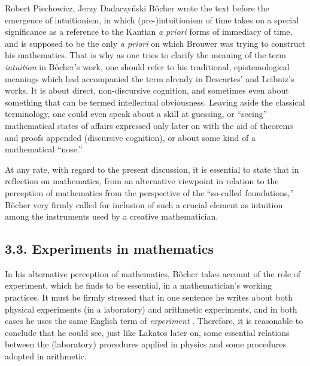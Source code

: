 \begin{artengenv}{Robert Piechowicz, Jerzy Dadaczyński}
Bôcher wrote the text before the emergence of intuitionism, in which (pre-)intuitionism of time takes on a special significance as a reference to the Kantian \textit{a priori} forms of immediacy of time, and is supposed to be the only \textit{a priori} on which Brouwer was trying to construct his mathematics. That is why as one tries to clarify the meaning of the term \textit{intuition} in Bôcher's work, one should refer to his traditional, epistemological meanings which had accompanied the term already in Descartes' and Leibniz's works. It is about direct, non-discursive cognition, and sometimes even about something that can be termed intellectual obviousness. Leaving aside the classical terminology, one could even speak about a skill at guessing, or ``seeing'' mathematical states of affairs expressed only later on with the aid of theorems and proofs appended (discursive cognition), or about some kind of a mathematical ``nose.''

At any rate, with regard to the present discussion, it is essential to state that in reflection on mathematics, from an alternative viewpoint in relation to the perception of mathematics from the perspective of the ``so-called foundations,'' Bôcher very firmly called for inclusion of such a crucial element as intuition among the instruments used by a creative mathematician.

\subsection{3.3. Experiments in mathematics}

In his alternative perception of mathematics, Bôcher takes account of the role of experiment, which he finds to be essential, in a mathematician's working practices. It must be firmly stressed that in one sentence he writes about both physical experiments (in a laboratory) and arithmetic experiments, and in both cases he uses the same English term of \textit{experiment}
\parencite[][p.134]{bocher_fundamental_1904}.
 Therefore, it is reasonable to conclude that he could see, just like Lakatos later on, some essential relations between the (laboratory) procedures applied in physics and some procedures adopted in arithmetic.


\end{artengenv}
